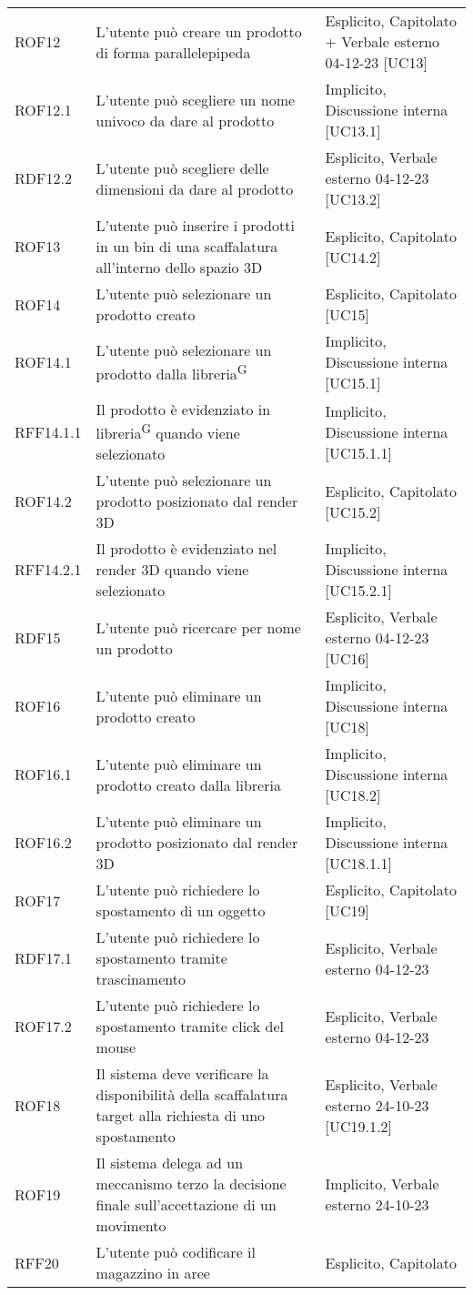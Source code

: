 \begin{xltabular}{\textwidth}{ p{0.1\textwidth} | X | p{0.3\textwidth} }
    ROF12 & L'utente può creare un prodotto di forma parallelepipeda & Esplicito, Capitolato + Verbale esterno 04-12-23 [UC13]\\
    ROF12.1 & L'utente può scegliere un nome univoco da dare al prodotto & Implicito, Discussione interna [UC13.1]\\
    RDF12.2 & L'utente può scegliere delle dimensioni da dare al prodotto & Esplicito, Verbale esterno 04-12-23 [UC13.2]\\    
    ROF13 & L'utente può inserire i prodotti in un bin di una scaffalatura all'interno dello spazio 3D & Esplicito, Capitolato [UC14.2]\\
    ROF14 & L'utente può selezionare un prodotto creato & Esplicito, Capitolato [UC15]\\
    ROF14.1 & L'utente può selezionare un prodotto dalla libreria\textsuperscript{G} & Implicito, Discussione interna [UC15.1]\\
    RFF14.1.1 & Il prodotto è evidenziato in libreria\textsuperscript{G} quando viene selezionato & Implicito, Discussione interna [UC15.1.1]\\
    ROF14.2 & L'utente può selezionare un prodotto posizionato dal render 3D & Esplicito, Capitolato [UC15.2]\\
    RFF14.2.1 & Il prodotto è evidenziato nel render 3D quando viene selezionato & Implicito, Discussione interna [UC15.2.1]\\
    RDF15 & L'utente può ricercare per nome un prodotto & Esplicito, Verbale esterno 04-12-23 [UC16]\\
    ROF16 & L'utente può eliminare un prodotto creato & Implicito, Discussione interna [UC18]\\
    ROF16.1 & L'utente può eliminare un prodotto creato dalla libreria & Implicito, Discussione interna [UC18.2]\\
    ROF16.2 & L'utente può eliminare un prodotto posizionato dal render 3D & Implicito, Discussione interna [UC18.1.1]\\
    ROF17 & L'utente può richiedere lo spostamento di un oggetto & Esplicito, Capitolato [UC19]\\
    RDF17.1 & L'utente può richiedere lo spostamento tramite trascinamento & Esplicito, Verbale esterno 04-12-23\\
    ROF17.2 & L'utente può richiedere lo spostamento tramite click del mouse & Esplicito, Verbale esterno 04-12-23\\
    ROF18 & Il sistema deve verificare la disponibilità della scaffalatura target alla richiesta di uno spostamento & Esplicito, Verbale esterno 24-10-23 [UC19.1.2]\\
    ROF19 & Il sistema delega ad un meccanismo terzo la decisione finale sull'accettazione di un movimento & Implicito, Verbale esterno 24-10-23\\
    RFF20 & L'utente può codificare il magazzino in aree & Esplicito, Capitolato \\
    \hline
\end{xltabular}


